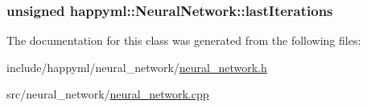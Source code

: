 \subsubsection[{\texorpdfstring{last\+Iterations}{lastIterations}}]{\setlength{\rightskip}{0pt plus 5cm}unsigned happyml\+::\+Neural\+Network\+::last\+Iterations\hspace{0.3cm}{\ttfamily [protected]}}\hypertarget{classhappyml_1_1NeuralNetwork_a87469b54a244913da3c4f39e4d99abdd}{}\label{classhappyml_1_1NeuralNetwork_a87469b54a244913da3c4f39e4d99abdd}


The documentation for this class was generated from the following files\+:\begin{DoxyCompactItemize}
\item 
include/happyml/neural\+\_\+network/\hyperlink{neural__network_8h}{neural\+\_\+network.\+h}\item 
src/neural\+\_\+network/\hyperlink{neural__network_8cpp}{neural\+\_\+network.\+cpp}\end{DoxyCompactItemize}
